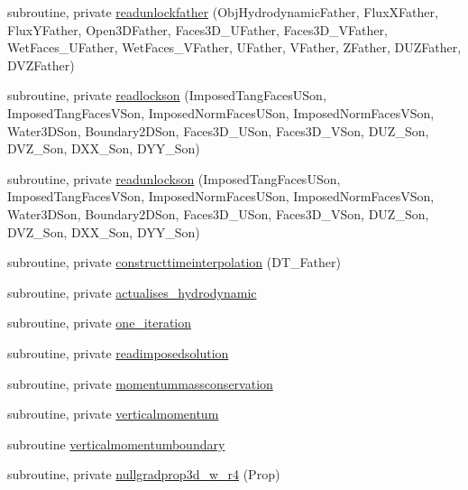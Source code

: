 \begin{DoxyCompactItemize}
\item 
subroutine, private \mbox{\hyperlink{namespacemodulehydrodynamic_afeaf24401841ea327d58dcaa1b45a92f}{readunlockfather}} (Obj\+Hydrodynamic\+Father, Flux\+X\+Father, Flux\+Y\+Father, Open3\+D\+Father, Faces3\+D\+\_\+\+U\+Father, Faces3\+D\+\_\+\+V\+Father, Wet\+Faces\+\_\+\+U\+Father, Wet\+Faces\+\_\+\+V\+Father, U\+Father, V\+Father, Z\+Father, D\+U\+Z\+Father, D\+V\+Z\+Father)
\item 
subroutine, private \mbox{\hyperlink{namespacemodulehydrodynamic_ad125ca32b530446bb6be8cbf582f792e}{readlockson}} (Imposed\+Tang\+Faces\+U\+Son, Imposed\+Tang\+Faces\+V\+Son, Imposed\+Norm\+Faces\+U\+Son, Imposed\+Norm\+Faces\+V\+Son, Water3\+D\+Son, Boundary2\+D\+Son, Faces3\+D\+\_\+\+U\+Son, Faces3\+D\+\_\+\+V\+Son, D\+U\+Z\+\_\+\+Son, D\+V\+Z\+\_\+\+Son, D\+X\+X\+\_\+\+Son, D\+Y\+Y\+\_\+\+Son)
\item 
subroutine, private \mbox{\hyperlink{namespacemodulehydrodynamic_a0f4e404d78ffa5a1fef104a6f662d68d}{readunlockson}} (Imposed\+Tang\+Faces\+U\+Son, Imposed\+Tang\+Faces\+V\+Son, Imposed\+Norm\+Faces\+U\+Son, Imposed\+Norm\+Faces\+V\+Son, Water3\+D\+Son, Boundary2\+D\+Son, Faces3\+D\+\_\+\+U\+Son, Faces3\+D\+\_\+\+V\+Son, D\+U\+Z\+\_\+\+Son, D\+V\+Z\+\_\+\+Son, D\+X\+X\+\_\+\+Son, D\+Y\+Y\+\_\+\+Son)
\item 
subroutine, private \mbox{\hyperlink{namespacemodulehydrodynamic_a49aef52cb34ad32b24871447f610a2a4}{constructtimeinterpolation}} (D\+T\+\_\+\+Father)
\item 
subroutine, private \mbox{\hyperlink{namespacemodulehydrodynamic_a106c8a097031ad23a85c1c2487284b7f}{actualises\+\_\+hydrodynamic}}
\item 
subroutine, private \mbox{\hyperlink{namespacemodulehydrodynamic_a054b8ffaff698f4cc430c2f7f0bc0da9}{one\+\_\+iteration}}
\item 
subroutine, private \mbox{\hyperlink{namespacemodulehydrodynamic_aeb9df81c7e232565cec18de1a51923d0}{readimposedsolution}}
\item 
subroutine, private \mbox{\hyperlink{namespacemodulehydrodynamic_aa05a995dd1f1f6550d1ecdfb0a0bab47}{momentummassconservation}}
\item 
subroutine, private \mbox{\hyperlink{namespacemodulehydrodynamic_aa70939d9e325f64455a339e7369d5b4c}{verticalmomentum}}
\item 
subroutine \mbox{\hyperlink{namespacemodulehydrodynamic_a7b6e382d0318b7799ad5228e8148e1ac}{verticalmomentumboundary}}
\item 
subroutine, private \mbox{\hyperlink{namespacemodulehydrodynamic_a5ec24d04376be68e9e9be33881024200}{nullgradprop3d\+\_\+w\+\_\+r4}} (Prop)

\end{DoxyCompactItemize}
